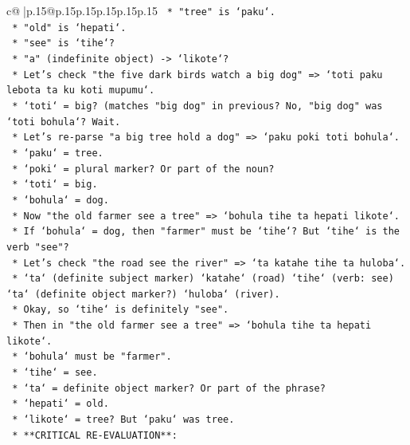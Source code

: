 \documentclass{article}
\begin{document}
{\begin{supertabular}{c@{$\;$}|p{.15\linewidth}@{}p{.15\linewidth}p{.15\linewidth}p{.15\linewidth}p{.15\linewidth}p{.15\linewidth}}
{{{\texttt{        *   "tree" is `paku`.} \\
\texttt{        *   "old" is `hepati`.} \\
\texttt{        *   "see" is `tihe`?} \\
\texttt{        *   "a" (indefinite object) {-}> `likote`?} \\
\texttt{        *   Let's check "the five dark birds watch a big dog" => `toti paku lebota ta ku koti mupumu`.} \\
\texttt{            *   `toti` = big? (matches "big dog" in previous? No, "big dog" was `toti bohula`? Wait.} \\
\texttt{            *   Let's re{-}parse "a big tree hold a dog" => `paku poki toti bohula`.} \\
\texttt{                *   `paku` = tree.} \\
\texttt{                *   `poki` = plural marker? Or part of the noun?} \\
\texttt{                *   `toti` = big.} \\
\texttt{                *   `bohula` = dog.} \\
\texttt{            *   Now "the old farmer see a tree" => `bohula tihe ta hepati likote`.} \\
\texttt{                *   If `bohula` = dog, then "farmer" must be `tihe`? But `tihe` is the verb "see"?} \\
\texttt{                *   Let's check "the road see the river" => `ta katahe tihe ta huloba`.} \\
\texttt{                    *   `ta` (definite subject marker) `katahe` (road) `tihe` (verb: see) `ta` (definite object marker?) `huloba` (river).} \\
\texttt{                *   Okay, so `tihe` is definitely "see".} \\
\texttt{                *   Then in "the old farmer see a tree" => `bohula tihe ta hepati likote`.} \\
\texttt{                    *   `bohula` must be "farmer".} \\
\texttt{                    *   `tihe` = see.} \\
\texttt{                    *   `ta` = definite object marker? Or part of the phrase?} \\
\texttt{                    *   `hepati` = old.} \\
\texttt{                    *   `likote` = tree? But `paku` was tree.} \\
\texttt{    *   **CRITICAL RE{-}EVALUATION**:} \\
}}}
\end{supertabular}}
\end{document}
